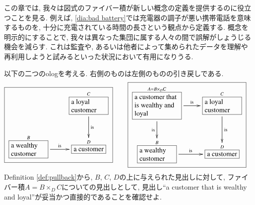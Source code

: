
この章では, 我々は図式のファイバー積が新しい概念の定義を提供するのに役立つことを見る. 例えば, \eqref{dia:bad battery}では充電器の調子が悪い携帯電話を意味するものを, 十分に充電されている時間の長さという観点から定義する. 概念を明示的にすることで, 我々は異なった集団に属する人々の間で誤解がしょうじる機会を減らす. これは監査や, あるいは他者によって集められたデータを理解や再利用しようと試みるといった状況において有用になりうる.

\begin{example}


以下の二つのologを考える. 右側のものは左側のものの引き戻しである.
\begin{align}\label{dia:wealthy and loyal}
\fbox{\xymatrixnocompile{&\obox{C}{.7in}{\rr a loyal customer}\LA{d}{is}\\\obox{B}{.7in}{\rr a wealthy customer}\LA{r}{is}&\smbox{D}{a customer}}}\hsp&\fbox{\xymatrix{\obox{A=B\times_DC}{.9in}{\rr a customer that is wealthy and loyal}\LAL{d}{is}\LA{r}{is}&\obox{C}{.7in}{\rr a loyal customer}\LA{d}{is}\\\obox{B}{.7in}{\rr a wealthy customer}\LA{r}{is}&\smbox{D}{a customer}}}
\end{align}
Definition \ref{def:pullback}から, $B$, $C$, $D$の上に与えられた見出しに対して, ファイバー積$A=B\times_DC$についての見出しとして, 見出し``a customer that is wealthy and loyal''が妥当かつ直接的であることを確認せよ.

\end{example}

